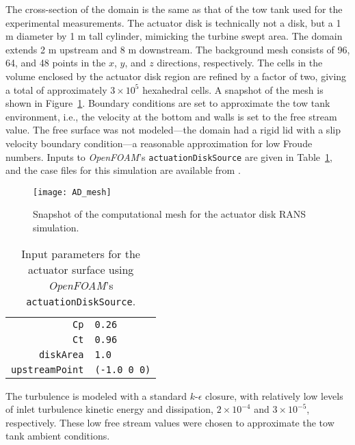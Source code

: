 The cross-section of the domain is the same as that of the tow tank used for the
experimental measurements. The actuator disk is technically not a disk, but a 1
m diameter by 1 m tall cylinder, mimicking the turbine swept area. The domain
extends 2 m upstream and 8 m downstream.  The background mesh consists of 96,
64, and 48 points in the $x$, $y$, and $z$ directions, respectively. The cells
in the volume enclosed by the actuator disk region are refined by a factor of
two, giving a total of  approximately $3 \times 10^5$ hexahedral cells. A
snapshot of the mesh is shown in Figure~\ref{fig:AD-mesh}. Boundary conditions
are set to approximate the tow tank environment, i.e., the velocity at the
bottom and walls is set to the free stream value. The free surface was not
modeled---the domain had a rigid lid with a slip velocity boundary condition---a
reasonable approximation for low Froude numbers. Inputs to \textit{OpenFOAM}'s
\texttt{actuationDiskSource} are given in Table~\ref{tab:AS}, and the case files
for this simulation are available from \cite{Bachant2014-OF-AS-case-files}.

\begin{figure}
    \centering

    \texttt{[image: AD\_mesh]}

    \caption{Snapshot of the computational mesh for the actuator disk RANS
        simulation.}
    
    \label{fig:AD-mesh}
\end{figure}

\begin{table}
    \begin{center}
        \begin{tabular}{r|l}
            \texttt{Cp} & \texttt{0.26} \\ 
            \texttt{Ct} & \texttt{0.96} \\ 
            \texttt{diskArea} & \texttt{1.0} \\ 
            \texttt{upstreamPoint} & \texttt{(-1.0 0 0)} \\ 
        \end{tabular} 
        \caption{Input parameters for the actuator surface using \textit{OpenFOAM}'s
            \texttt{actuationDiskSource}.}
    \label{tab:AS}
    \end{center}
\end{table}

The turbulence is modeled with a standard $k$-$\epsilon$ closure, with
relatively low levels of inlet turbulence kinetic energy and dissipation, $2
\times 10^{-4}$ and $3 \times 10^{-5}$, respectively. These low free stream
values were chosen to approximate the tow tank ambient conditions.

